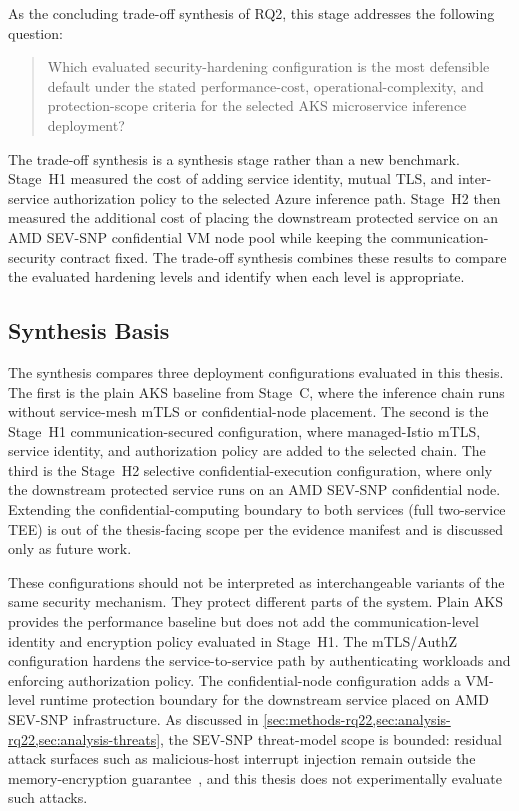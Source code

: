 As the concluding trade-off synthesis of RQ2, this stage addresses the following question:

\begin{quote}
Which evaluated security-hardening configuration is the most defensible default
under the stated performance-cost, operational-complexity, and protection-scope
criteria for the selected AKS microservice inference deployment?
\end{quote}

The trade-off synthesis is a synthesis stage rather than a new benchmark. Stage~H1 measured the
cost of adding service identity, mutual TLS, and inter-service authorization
policy to the selected Azure inference path. Stage~H2 then measured the additional
cost of placing the downstream protected service on an AMD SEV-SNP confidential
VM node pool while keeping the communication-security contract fixed. The trade-off synthesis
combines these results to compare the evaluated hardening levels and identify
when each level is appropriate.

\subsection{Synthesis Basis}

The synthesis compares three deployment configurations evaluated in this
thesis. The first is the plain AKS baseline from Stage~C, where the inference
chain runs without service-mesh mTLS or confidential-node placement. The second
is the Stage~H1 communication-secured configuration, where managed-Istio mTLS,
service identity, and authorization policy are added to the selected chain.
The third is the Stage~H2 selective confidential-execution configuration, where
only the downstream protected service runs on an AMD SEV-SNP confidential
node. Extending the confidential-computing boundary to both services (full
two-service TEE) is out of the thesis-facing scope per the evidence manifest
and is discussed only as future work.

These configurations should not be interpreted as interchangeable variants of
the same security mechanism. They protect different parts of the system. Plain
AKS provides the performance baseline but does not add the communication-level
identity and encryption policy evaluated in Stage~H1. The mTLS/AuthZ configuration
hardens the service-to-service path by authenticating workloads and enforcing
authorization policy. The confidential-node configuration adds a VM-level
runtime protection boundary for the downstream service placed on AMD SEV-SNP
infrastructure. As discussed in
\cref{sec:methods-rq22,sec:analysis-rq22,sec:analysis-threats}, the SEV-SNP
threat-model scope is bounded: residual attack surfaces such as malicious-host
interrupt injection remain outside the memory-encryption
guarantee~\cite{schluter2024_heckler}, and this thesis does not experimentally
evaluate such attacks.

